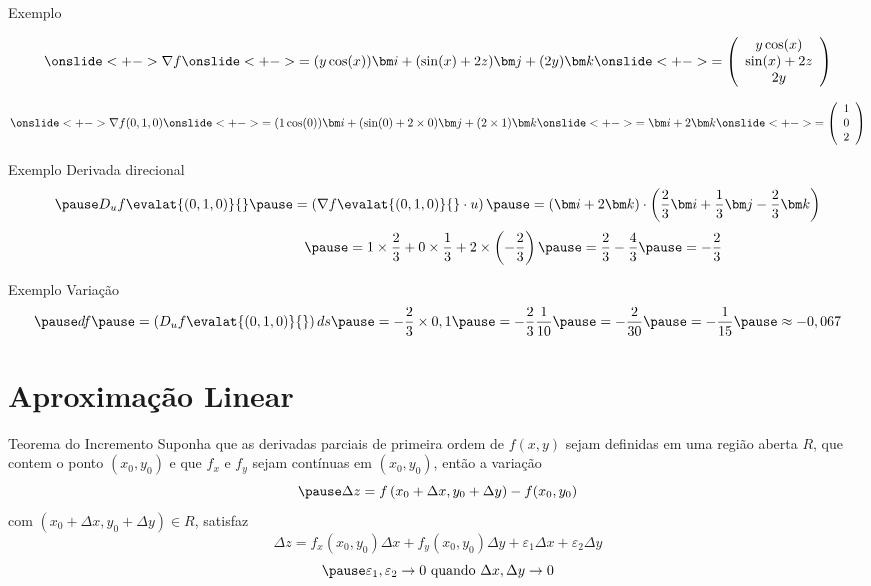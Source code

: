 \begin{frame}{Exemplo \theexemplo}

  \[
    \onslide<+->{\nabla f}
    \onslide<+->{= (y\cos(x))\veci + (\sin(x) + 2z)\vecj + (2y)\veck}
    \onslide<+->{= \left(\begin{array}{c}
       y\cos(x) \\
       \sin(x) + 2z \\
       2y
    \end{array}\right)}
  \]

  \[
    \onslide<+->{\nabla f(0, 1, 0)}
    \onslide<+->{= (1\cos(0))\veci + (\sin(0) + 2\times 0)\vecj + (2\times 1)\veck}
    \onslide<+->{= \veci + 2\veck}
    \onslide<+->{= \left(\begin{array}{r} 1 \\ 0 \\ 2 \end{array}\right)}
  \]
\end{frame}

\begin{frame}{Exemplo \theexemplo}
  Derivada direcional
  \[
    \pause
    D_u f\evalat{(0, 1, 0)}{}
    \pause
    = \left(\nabla f\evalat{(0, 1, 0)}{} \cdot u\right)
    \pause
    = \left(\veci + 2\veck\right)
    \cdot
    \left(\frac{2}{3} \veci + \frac{1}{3} \vecj - \frac{2}{3} \veck\right)
  \]
  \[
    \hphantom{D_u f\evalat{(0, 1, 0)}{}}
    \pause
    = 1\times\frac{2}{3} + 0\times\frac{1}{3} + 2 \times\left(- \frac{2}{3}\right)
    \pause
    = \frac{2}{3} - \frac{4}{3}
    \pause
    = -\frac{2}{3}
  \]
\end{frame}

\begin{frame}{Exemplo \theexemplo}
  Variação
  \[
    \pause
    df
    \pause
    = \left(D_u f\evalat{(0, 1, 0)}{}\right) ds
    \pause
    = -\frac{2}{3}\times 0,1
    \pause
    = -\frac{2}{3} \frac{1}{10}
    \pause
    = -\frac{2}{30}
    \pause
    = -\frac{1}{15}
    \pause
    \approx -0,067
  \]
\end{frame}

\section{Aproximação Linear}

\begin{frame}{Teorema do Incremento}
  Suponha que as derivadas parciais de primeira ordem de $f(x, y)$ sejam
  definidas em uma região aberta $R$, que contem o ponto $(x_0, y_0)$
  \pause
  e que $f_x$ e $f_y$ sejam contínuas em $(x_0, y_0)$,
  \pause
  então a variação
  \[
    \pause
    \Delta z
    = f\left(x_0+\Delta x, y_0 + \Delta y\right)
    - f(x_0, y_0)
  \]
  \pause
  com \(\left(x_0+\Delta x, y_0 + \Delta y\right)\in R\),
  \pause
  satisfaz
  \[
    \Delta z
    = f_x(x_0, y_0) \Delta x
    + f_y(x_0, y_0) \Delta y
    + \varepsilon_1 \Delta x
    + \varepsilon_2 \Delta y
  \]
  \[
    \pause
    \varepsilon_1, \varepsilon_2 \to 0 \text{ quando } \Delta x, \Delta y \to 0
  \]
\end{frame}

